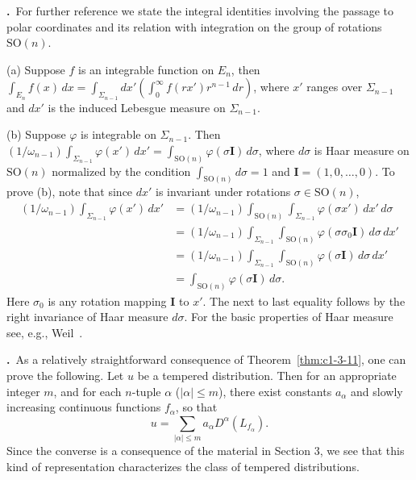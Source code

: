 \label{eq:c1-4-14}\textbf{\theequation.}~For further
reference we state the integral identities involving the passage to polar
coordinates and its relation with integration on the group of rotations
$\mathrm{SO}(n)$.

\textup{(a)} Suppose $f$ is an integrable function on $E_{n}$, then
$\int_{E_{n}} f(x) \, dx = \int_{\Sigma_{n-1}} dx' (\int_{0}^{\infty} f(rx') r^{n-1} \, dr)$,
where $x'$ ranges over $\Sigma_{n-1}$ and $dx'$ is the induced Lebesgue
measure on $\Sigma_{n-1}$.

\textup{(b)} Suppose $\varphi$ is integrable on $\Sigma_{n-1}$. Then
$(1/\omega_{n-1})\int_{\Sigma_{n-1}} \varphi(x') \, dx' = \int_{\mathrm{SO}(n)} \varphi(\sigma\mathbf{I}) \, d\sigma$,
where $d\sigma$ is Haar measure on $\mathrm{SO}(n)$ normalized by the condition
$\int_{\mathrm{SO}(n)} d\sigma = 1$ and $\mathbf{I} = (1, 0, \ldots, 0)$. To prove (b),
note that since $dx'$ is invariant under rotations $\sigma \in \mathrm{SO}(n)$,
\[
\begin{aligned}(1/\omega_{n-1})\int_{\Sigma_{n-1}} \varphi(x') \, dx'&=(1/\omega_{n-1})\int_{\mathrm{SO}(n)}\int_{\Sigma_{n-1}} \varphi(\sigma x') \, dx' \, d\sigma\\
&=(1/\omega_{n-1})\int_{\Sigma_{n-1}}\int_{\mathrm{SO}(n)} \varphi(\sigma\sigma_{0}\mathbf{I}) \, d\sigma \, dx'\\
&=(1/\omega_{n-1})\int_{\Sigma_{n-1}}\int_{\mathrm{SO}(n)} \varphi(\sigma\mathbf{I}) \, d\sigma \, dx'\\
&=\int_{\mathrm{SO}(n)} \varphi(\sigma\mathbf{I}) \, d\sigma.\end{aligned}
\]
Here $\sigma_{0}$ is any rotation mapping $\mathbf{I}$ to $x'$. The next to
last equality follows by the right invariance of Haar measure $d\sigma$. For
the basic properties of Haar measure see, e.g., Weil~\cite{Weil1}.

\label{eq:c1-4-15}\textbf{\theequation.}~As a
relatively straightforward consequence of Theorem~\ref{thm:c1-3-11}, one can
prove the following. Let $u$ be a tempered distribution. Then for an
appropriate integer $m$, and for each $n$-tuple $\alpha$ ($|\alpha| \leq m$),
there exist constants $a_{\alpha}$ and slowly increasing continuous functions
$f_{\alpha}$, so that
\[
u=\sum_{|\alpha|\leq m}a_{\alpha}D^{\alpha}(L_{f_{\alpha}}).
\]
Since the converse is a consequence of the material in Section 3, we see that
this kind of representation characterizes the class of tempered distributions.

